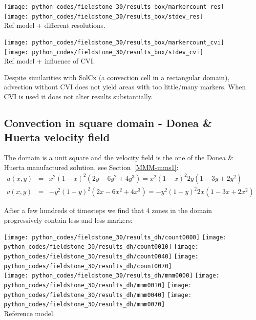 \begin{center}
\texttt{[image: python\_codes/fieldstone\_30/results\_box/markercount\_res]}
\texttt{[image: python\_codes/fieldstone\_30/results\_box/stdev\_res]}\\
{\captionfont Ref model + different resolutions.}
\end{center}

\begin{center}
\texttt{[image: python\_codes/fieldstone\_30/results\_box/markercount\_cvi]}
\texttt{[image: python\_codes/fieldstone\_30/results\_box/stdev\_cvi]}\\
{\captionfont Ref model + influence of CVI.}
\end{center}

Despite similarities with SolCx (a convection cell in a rectangular domain),
advection without CVI does not yield areas with too little/many markers.
When CVI is used it does not alter results substantially.


\newpage
\subsection*{Convection in square domain - Donea \& Huerta velocity field}

The domain is a unit square and the velocity field is the one of the 
Donea \& Huerta manufactured solution, see Section~\ref{MMM-mms1}:
\begin{eqnarray}
u(x,y) &=& x^2(1- x)^2 (2y - 6y^2 + 4y^3) = x^2(1-x)^2 2y (1-3y+2y^2) \nonumber\\
v(x,y) &=& -y^2 (1 - y)^2 (2x - 6x^2 + 4x^3) = -y^2 (1 - y)^2 2x (1-3x+2x^2) 
\end{eqnarray}

After a few hundreds of timesteps we find that 4 zones in the domain 
progressively contain less and less markers:

\begin{center}
\texttt{[image: python\_codes/fieldstone\_30/results\_dh/count0000]}
\texttt{[image: python\_codes/fieldstone\_30/results\_dh/count0010]}
\texttt{[image: python\_codes/fieldstone\_30/results\_dh/count0040]}
\texttt{[image: python\_codes/fieldstone\_30/results\_dh/count0070]}\\
\texttt{[image: python\_codes/fieldstone\_30/results\_dh/mmm0000]}
\texttt{[image: python\_codes/fieldstone\_30/results\_dh/mmm0010]}
\texttt{[image: python\_codes/fieldstone\_30/results\_dh/mmm0040]}
\texttt{[image: python\_codes/fieldstone\_30/results\_dh/mmm0070]}\\
{\captionfont Reference model.}
\end{center}

